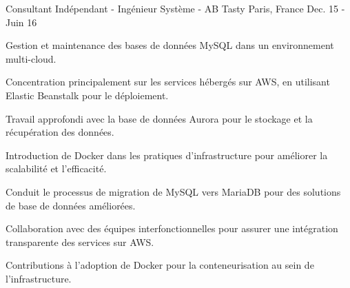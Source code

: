 \begin{cventries}
\cventry
{Consultant Indépendant - Ingénieur Système - } %
{AB Tasty} %
{Paris, France} %
{Dec. 15 - Juin 16} %
{
  \begin{cvitems} %
    \item {Gestion et maintenance des bases de données MySQL dans un environnement multi-cloud.}
    \item {Concentration principalement sur les services hébergés sur AWS, en utilisant Elastic Beanstalk pour le déploiement.}
    \item {Travail approfondi avec la base de données Aurora pour le stockage et la récupération des données.}
    \item {Introduction de Docker dans les pratiques d'infrastructure pour améliorer la scalabilité et l'efficacité.}
    \item {Conduit le processus de migration de MySQL vers MariaDB pour des solutions de base de données améliorées.}
    \item {Collaboration avec des équipes interfonctionnelles pour assurer une intégration transparente des services sur AWS.}
    \item {Contributions à l'adoption de Docker pour la conteneurisation au sein de l'infrastructure.}
  \end{cvitems}
}


\end{cventries}


